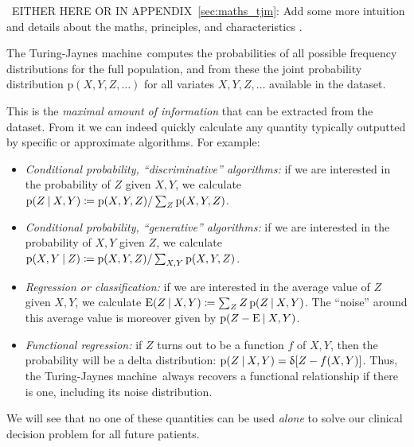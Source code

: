 \documentclass[utf8]{FrontiersinHarvard} %
\newcommand*{\pencil}{{\fontencoding{U}\fontfamily{fontawesometwo}\selectfont\symbol{210}}}
\newcommand{\mynotep}[1]{{\color{notecolour}\pencil\ #1}}
\newcommand*{\p}{\mathrm{p}}%
\newcommand*{\E}{\mathrm{E}}
\renewcommand*{\|}[1][]{\nonscript\:#1\vert\nonscript\:\mathopen{}}
\newcommand*{\defd}{\coloneqq}
\newcommand*{\delt}{\updelta}
\newcommand*{\tjm}{Turing-Jaynes machine}
\begin{document}
\mynotep{EITHER HERE OR IN APPENDIX~\ref{sec:maths_tjm}: Add some more intuition and details about the maths, principles, and characteristics} \citep{dunsonetal2011,rossi2014,rasmussen1999}.

The \tjm\ computes the probabilities of all possible frequency distributions for the full population, and from these the joint probability distribution $\p(X,Y,Z,\dotsc)$ for all variates $X,Y,Z,\dotsc$ available in the dataset.

This is the\emph{ maximal amount of information} that can be extracted from the dataset. From it we can indeed quickly calculate any quantity typically outputted by specific or approximate algorithms. For example:
\begin{itemize}
\item \emph{Conditional probability, \enquote{discriminative} algorithms:} if we are interested in the probability of $Z$ given $X,Y$, we calculate $\p(Z \| X,Y) \defd \p(X,Y,Z)/\sum_{Z}\p(X,Y,Z)$.
\item \emph{Conditional probability, \enquote{generative} algorithms:} if we are interested in the probability of $X,Y$ given $Z$, we calculate $\p(X,Y\|Z) \defd \p(X,Y,Z)/\sum_{X,Y}\p(X,Y,Z)$.
\item \emph{Regression or classification:} if we are interested in the average value of $Z$ given $X,Y$, we calculate $\E(Z \| X,Y) \defd \sum_{Z}Z\,\p(Z\|X,Y)$. The \enquote{noise} around this average value is moreover given by $\p(Z-\E\|X,Y)$.
\item \emph{Functional regression:} if $Z$ turns out to be a function $f$ of $X,Y$, then the probability will be a delta distribution: $\p(Z\|X,Y) = \delt[Z-f(X,Y)]$.
  Thus, the \tjm\ always recovers a functional relationship if there is one, including its noise distribution.
\end{itemize}
We will see that no one of these quantities can be used \emph{alone} to solve our clinical decision problem for all future patients.
\end{document}
